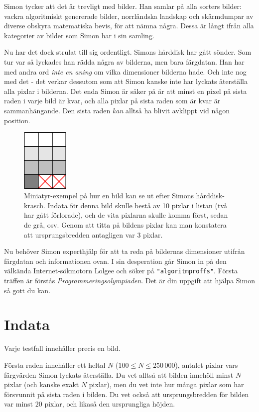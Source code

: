 
Simon tycker att det är trevligt med bilder. Han samlar på alla sorters bilder:
vackra algoritmiskt genererade bilder, norrländska landskap och skärmdumpar av
diverse obskyra matematiska bevis, för att nämna några. Dessa är långt ifrån
alla kategorier av bilder som Simon har i sin samling.

Nu har det dock strulat till sig ordentligt. Simons hårddisk har gått sönder.
Som tur var så lyckades han rädda några av bilderna, men bara färgdatan. Han
har med andra ord \emph{inte en aning} om vilka dimensioner bilderna hade. Och
inte nog med det - det verkar dessutom som att Simon kanske inte har lyckats
återställa alla pixlar i bilderna. Det enda Simon är säker på är att minst en
pixel på sista raden i varje bild är kvar, och alla pixlar på sista raden som
är kvar är sammanhängande. Den sista raden \emph{kan} alltså ha blivit avklippt
vid någon position.

\begin{figure}[ht!]
\centering
\includegraphics[width=0.2\textwidth]{example.png}
\caption{Miniatyr-exempel på hur en bild kan se ut efter Simons hårddisk-krasch. Indata
för denna bild skulle bestå av 10 pixlar i listan (två har gått förlorade), och de vita
pixlarna skulle komma först, sedan de grå, osv. Genom att titta på bildens pixlar kan
man konstatera att ursprungsbredden antagligen var 3 pixlar.}
\label{fig:sample1}
\end{figure}

Nu behöver Simon experthjälp för att ta reda på bildernas dimensioner utifrån
färgdatan och informationen ovan. I sin desperation går Simon in på den
välkända Internet-sökmotorn Lolgee och söker på \texttt{"algoritmproffs"}.
Första träffen är förstås \emph{Programmeringsolympiaden}. Det är din uppgift
att hjälpa Simon så gott du kan.

\section*{Indata}
Varje testfall innehåller precis en bild.

Första raden innehåller ett heltal $N$ ($100 \leq N \leq 250\,000$), antalet pixlar vars
färgvärden Simon lyckats återställa. Du vet alltså att bilden innehöll minst
$N$ pixlar (och kanske exakt $N$ pixlar), men du vet inte hur många pixlar som
har försvunnit på sista raden i bilden. Du vet också att ursprungsbredden för
bilden var minst $20$ pixlar, och likaså den ursprungliga höjden.

